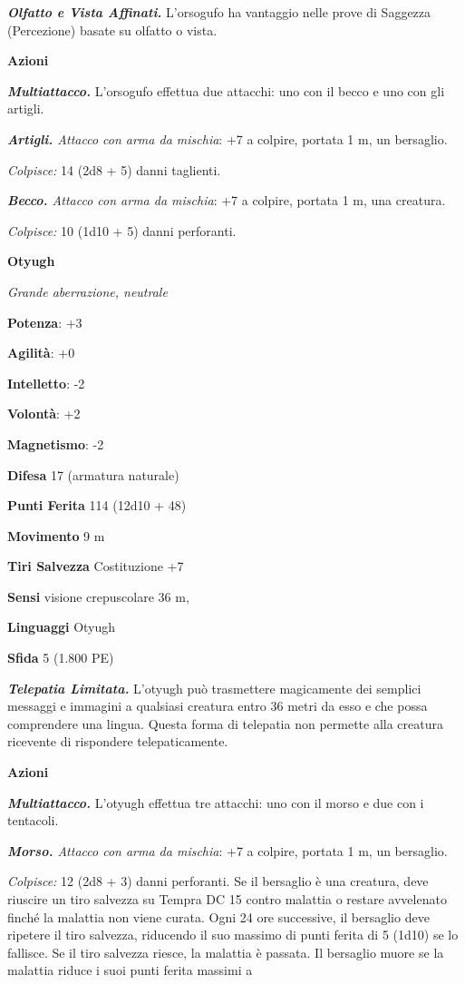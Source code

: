 \begin{multicols}{2}
\emph{\textbf{Olfatto e Vista Affinati.}} L'orsogufo ha vantaggio nelle
prove di Saggezza (Percezione) basate su olfatto o vista.

\smallskip\textbf{Azioni}

\emph{\textbf{Multiattacco.}} L'orsogufo effettua due attacchi: uno con
il becco e uno con gli artigli.

\emph{\textbf{Artigli.} Attacco con arma da mischia}: +7 a colpire,
portata 1 m, un bersaglio.

\emph{Colpisce:} 14 (2d8 + 5) danni taglienti.

\emph{\textbf{Becco.} Attacco con arma da mischia}: +7 a colpire,
portata 1 m, una creatura.

\emph{Colpisce:} 10 (1d10 + 5) danni perforanti.


\textbf{Otyugh}

\emph{Grande aberrazione, neutrale}

\textbf{Potenza}: +3

\textbf{Agilità}: +0

\textbf{Intelletto}: -2

\textbf{Volontà}: +2

\textbf{Magnetismo}: -2

\textbf{Difesa} 17 (armatura naturale)

\textbf{Punti Ferita} 114 (12d10 + 48)

\textbf{Movimento} 9 m

\textbf{Tiri Salvezza} Costituzione +7

\textbf{Sensi} visione crepuscolare 36 m, 

\textbf{Linguaggi} Otyugh

\textbf{Sfida} 5 (1.800 PE)\smallskip

\emph{\textbf{Telepatia Limitata.}} L'otyugh può trasmettere magicamente
dei semplici messaggi e immagini a qualsiasi creatura entro 36 metri da
esso e che possa comprendere una lingua. Questa forma di telepatia non
permette alla creatura ricevente di rispondere telepaticamente.

\smallskip\textbf{Azioni}

\emph{\textbf{Multiattacco.}} L'otyugh effettua tre attacchi: uno con il
morso e due con i tentacoli.

\emph{\textbf{Morso.} Attacco con arma da mischia}: +7 a colpire,
portata 1 m, un bersaglio.

\emph{Colpisce:} 12 (2d8 + 3) danni perforanti. Se il bersaglio è una
creatura, deve riuscire un tiro salvezza su Tempra DC 15 contro
malattia o restare avvelenato finché la malattia non viene curata. Ogni
24 ore successive, il bersaglio deve ripetere il tiro salvezza,
riducendo il suo massimo di punti ferita di 5 (1d10) se lo fallisce. Se
il tiro salvezza riesce, la malattia è passata. Il bersaglio muore se la
malattia riduce i suoi punti ferita massimi a



\end{multicols}
